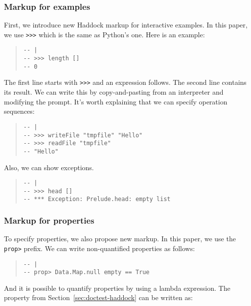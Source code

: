 \documentclass[preprint]{sigplanconf}
\begin{document}
\subsubsection{Markup for examples}

\noindent First, we introduce new Haddock markup for interactive examples.
In this paper, we use {\tt >>>} which is the same as Python's one.
Here is an example:

\begin{quote}
\small
\begin{verbatim}
-- |
-- >>> length []
-- 0
\end{verbatim}
\end{quote}

\noindent The first line starts with {\tt >>>} and an expression follows. The second line contains its result. We can write this by copy-and-pasting from an interpreter and modifying the prompt.
It's worth explaining that we can specify operation sequences:

\begin{quote}
\small
\begin{verbatim}
-- |
-- >>> writeFile "tmpfile" "Hello"
-- >>> readFile "tmpfile"
-- "Hello"
\end{verbatim}
\end{quote}

\noindent Also, we can show exceptions.

\begin{quote}
\small
\begin{verbatim}
-- |
-- >>> head []
-- *** Exception: Prelude.head: empty list
\end{verbatim}
\end{quote}

\subsubsection{Markup for properties}
\label{sec:markup}

\noindent To specify properties, we also propose new markup. In this paper, we
use the {\tt prop>} prefix. We can write non-quantified properties as follows:

\begin{quote}
\small
\begin{verbatim}
-- |
-- prop> Data.Map.null empty == True
\end{verbatim}
\end{quote}

\noindent And it is possible to quantify properties by using a
lambda expression. The property from Section~\ref{sec:doctest-haddock}
can be written as:
\end{document}
